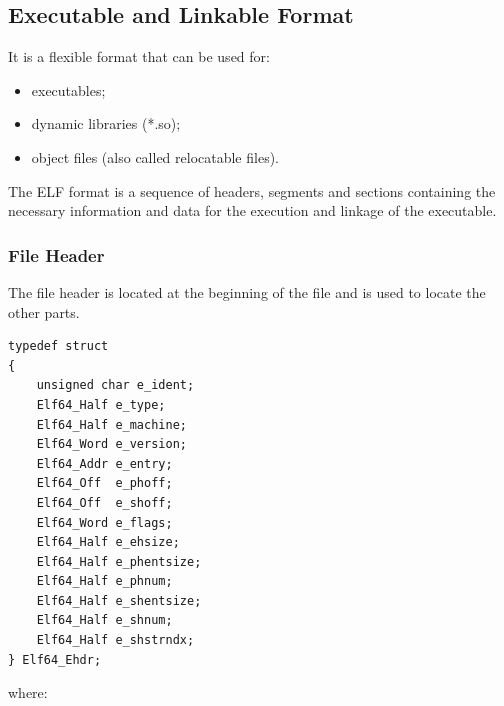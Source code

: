 \subsection{Executable and Linkable Format} It is a flexible format that can be used for:
\begin{itemize}
    \item executables; 
    \item dynamic libraries (*.so);
    \item object files (also called relocatable files).
\end{itemize}
The ELF format is a sequence of headers, segments and sections containing the necessary information and data for the 
execution and linkage of the executable.
\subsubsection{File Header}
The file header is located at the beginning of the file and is used to locate the other parts.
\begin{lstlisting}[style=ansic, caption={File Header}, label=ehdr] 
typedef struct
{ 
    unsigned char e_ident;
    Elf64_Half e_type;
    Elf64_Half e_machine;
    Elf64_Word e_version;
    Elf64_Addr e_entry;
    Elf64_Off  e_phoff;
    Elf64_Off  e_shoff;
    Elf64_Word e_flags;
    Elf64_Half e_ehsize;
    Elf64_Half e_phentsize;
    Elf64_Half e_phnum;
    Elf64_Half e_shentsize;
    Elf64_Half e_shnum;
    Elf64_Half e_shstrndx;
} Elf64_Ehdr; 
\end{lstlisting}
where: 
